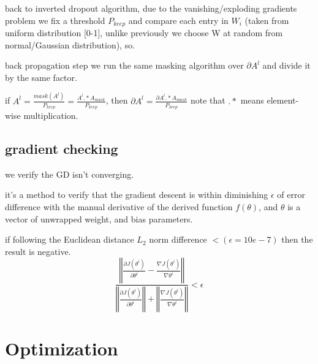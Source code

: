 \documentclass[4apaper,12pt]{book}
\begin{document}
\begin{description}
\item back to inverted dropout algorithm, due to the vanishing/exploding gradients problem we fix a threshold $P_{keep}$ and compare each entry in $W_i$ (taken from uniform distribution [0-1], unlike previously we choose W at random from normal/Gaussian distribution), so.
\item back propagation step we run the same masking algorithm over $\partial{A^{l}}$ and divide it by the same factor.
\item if $A^{l}=\frac{mask(A^{l})}{P_{keep}}=\frac{A^{l}.*A_{mask}}{P_{keep}}$, then $\partial{A^{l}}=\frac{\partial{A^{l}}.*A_{mask}}{P_{keep}}$ note that $.*$ means element-wise multiplication.
  \subsection {gradient checking}
  \item we verify the GD isn't converging.
\item it's a method to verify that the gradient descent is within diminishing $\epsilon$ of error difference with the manual derivative of the derived function $f(\theta)$, and $\theta$ is a vector of unwrapped weight, and bias parameters.

\item if following the Euclidean distance $L_2$ norm difference $ < (\epsilon =10e-7)$ then the result is negative. $$
  \frac{
    \left\Vert\frac{\partial{J(\theta^i)}}{\partial{\theta^i}} - \frac{\nabla {J(\theta^i)}}{\nabla{\theta^i}}\right\Vert
  }
       {
         \left\Vert\frac{\partial{J(\theta^i)}}{\partial{\theta^i}}\right\Vert +
         \left\Vert\frac{\nabla{J(\theta^i)}}{\nabla{\theta^i}}\right\Vert }  < \epsilon $$
\end{description}

\section {Optimization}
\end{document}
